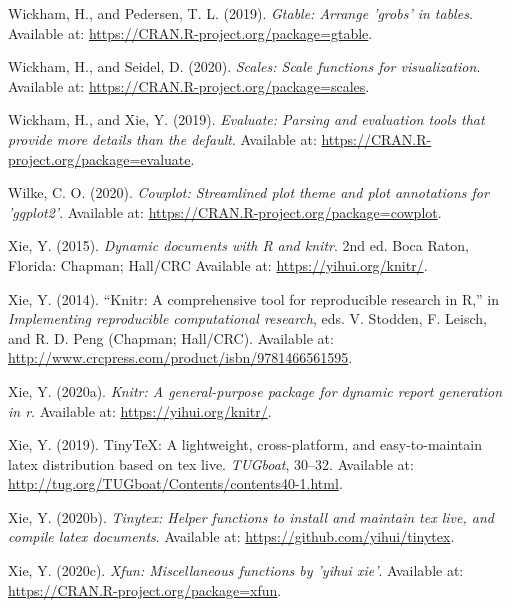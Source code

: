 \documentclass[utf8]{frontiersSCNS}
\newlength{\cslhangindent}
\newenvironment{cslreferences}%
  {\setlength{\parindent}{0pt}%
  \everypar{\setlength{\hangindent}{\cslhangindent}}\ignorespaces}%
  {\par}
\begin{document}
\begin{cslreferences}
\leavevmode\hypertarget{ref-wickham2019gtable}{}%
Wickham, H., and Pedersen, T. L. (2019). \emph{Gtable: Arrange 'grobs'
in tables}. Available at:
\url{https://CRAN.R-project.org/package=gtable}.

\leavevmode\hypertarget{ref-wickham2020scales}{}%
Wickham, H., and Seidel, D. (2020). \emph{Scales: Scale functions for
visualization}. Available at:
\url{https://CRAN.R-project.org/package=scales}.

\leavevmode\hypertarget{ref-wickham2019evaluate}{}%
Wickham, H., and Xie, Y. (2019). \emph{Evaluate: Parsing and evaluation
tools that provide more details than the default}. Available at:
\url{https://CRAN.R-project.org/package=evaluate}.

\leavevmode\hypertarget{ref-wilke2020cowplot}{}%
Wilke, C. O. (2020). \emph{Cowplot: Streamlined plot theme and plot
annotations for 'ggplot2'}. Available at:
\url{https://CRAN.R-project.org/package=cowplot}.

\leavevmode\hypertarget{ref-xie2015dynamic}{}%
Xie, Y. (2015). \emph{Dynamic documents with R and knitr}. 2nd ed. Boca
Raton, Florida: Chapman; Hall/CRC Available at:
\url{https://yihui.org/knitr/}.

\leavevmode\hypertarget{ref-xie2014knitr}{}%
Xie, Y. (2014). ``Knitr: A comprehensive tool for reproducible research
in R,'' in \emph{Implementing reproducible computational research}, eds.
V. Stodden, F. Leisch, and R. D. Peng (Chapman; Hall/CRC). Available at:
\url{http://www.crcpress.com/product/isbn/9781466561595}.

\leavevmode\hypertarget{ref-xie2020knitr}{}%
Xie, Y. (2020a). \emph{Knitr: A general-purpose package for dynamic
report generation in r}. Available at: \url{https://yihui.org/knitr/}.

\leavevmode\hypertarget{ref-xie2019tinytex}{}%
Xie, Y. (2019). TinyTeX: A lightweight, cross-platform, and
easy-to-maintain latex distribution based on tex live. \emph{TUGboat},
30--32. Available at:
\url{http://tug.org/TUGboat/Contents/contents40-1.html}.

\leavevmode\hypertarget{ref-xie2020tinytex}{}%
Xie, Y. (2020b). \emph{Tinytex: Helper functions to install and maintain
tex live, and compile latex documents}. Available at:
\url{https://github.com/yihui/tinytex}.

\leavevmode\hypertarget{ref-xie2020xfun}{}%
Xie, Y. (2020c). \emph{Xfun: Miscellaneous functions by 'yihui xie'}.
Available at: \url{https://CRAN.R-project.org/package=xfun}.


\end{cslreferences}
\end{document}
